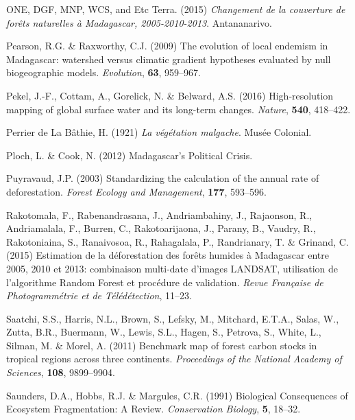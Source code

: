 \documentclass[]{article}
\theoremstyle{definition}
\theoremstyle{definition}
\theoremstyle{definition}
\theoremstyle{remark}
\begin{document}
\leavevmode\hypertarget{ref-ONE2015}{}%
ONE, DGF, MNP, WCS, and Etc Terra. (2015) \emph{Changement de la
couverture de forêts naturelles à Madagascar, 2005-2010-2013}.
Antananarivo.

\leavevmode\hypertarget{ref-Pearson2009}{}%
Pearson, R.G. \& Raxworthy, C.J. (2009) The evolution of local endemism
in Madagascar: watershed versus climatic gradient hypotheses evaluated
by null biogeographic models. \emph{Evolution}, \textbf{63}, 959--967.

\leavevmode\hypertarget{ref-Pekel2016}{}%
Pekel, J.-F., Cottam, A., Gorelick, N. \& Belward, A.S. (2016)
High-resolution mapping of global surface water and its long-term
changes. \emph{Nature}, \textbf{540}, 418--422.

\leavevmode\hypertarget{ref-Perrier1921}{}%
Perrier de La Bâthie, H. (1921) \emph{La végétation malgache}. Musée
Colonial.

\leavevmode\hypertarget{ref-Ploch2012}{}%
Ploch, L. \& Cook, N. (2012) Madagascar's Political Crisis.

\leavevmode\hypertarget{ref-Puyravaud2003}{}%
Puyravaud, J.P. (2003) Standardizing the calculation of the annual rate
of deforestation. \emph{Forest Ecology and Management}, \textbf{177},
593--596.

\leavevmode\hypertarget{ref-Rakotomalala2015}{}%
Rakotomala, F., Rabenandrasana, J., Andriambahiny, J., Rajaonson, R.,
Andriamalala, F., Burren, C., Rakotoarijaona, J., Parany, B., Vaudry,
R., Rakotoniaina, S., Ranaivosoa, R., Rahagalala, P., Randrianary, T. \&
Grinand, C. (2015) Estimation de la déforestation des forêts humides à
Madagascar entre 2005, 2010 et 2013: combinaison multi-date d'images
LANDSAT, utilisation de l'algorithme Random Forest et procédure de
validation. \emph{Revue Française de Photogrammétrie et de
Télédétection}, 11--23.

\leavevmode\hypertarget{ref-Saatchi2011}{}%
Saatchi, S.S., Harris, N.L., Brown, S., Lefsky, M., Mitchard, E.T.A.,
Salas, W., Zutta, B.R., Buermann, W., Lewis, S.L., Hagen, S., Petrova,
S., White, L., Silman, M. \& Morel, A. (2011) Benchmark map of forest
carbon stocks in tropical regions across three continents.
\emph{Proceedings of the National Academy of Sciences}, \textbf{108},
9899--9904.

\leavevmode\hypertarget{ref-Saunders1991}{}%
Saunders, D.A., Hobbs, R.J. \& Margules, C.R. (1991) Biological
Consequences of Ecosystem Fragmentation: A Review. \emph{Conservation
Biology}, \textbf{5}, 18--32.
\end{document}
